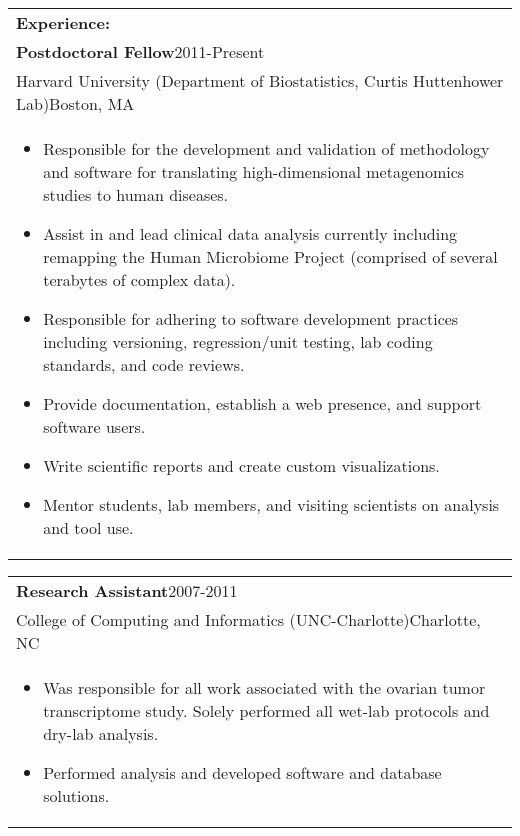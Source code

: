 \documentclass[12pt]{report}
\def\fullLength{6.5in}
\begin{document}
\begin{table}[!ht]
\begin{tabular}{p{\fullLength}}
\textbf{\Large Experience:}\\
\textbf{Postdoctoral Fellow}\hfill 2011-Present\\
Harvard University (Department of Biostatistics, Curtis Huttenhower Lab)\hfill Boston, MA\\
\vspace{-7.0mm}
\begin{itemize}\addtolength{\itemsep}{-0.5\baselineskip}
\item Responsible for the development and validation of methodology and software for translating high-dimensional metagenomics studies to human diseases.
\item Assist in and lead clinical data analysis currently including remapping the Human Microbiome Project (comprised of several terabytes of complex data).
\item Responsible for adhering to software development practices including versioning, regression/unit testing, lab coding standards, and code reviews.
\item Provide documentation, establish a web presence, and support software users.
\item Write scientific reports and create custom visualizations.
\item Mentor students, lab members, and visiting scientists on analysis and tool use.
\end{itemize}
\end{tabular}
\end{table}

\vspace{-12.0mm}

\begin{table}[!ht]
\begin{tabular}{p{\fullLength}}
\textbf{Research Assistant}\hfill 2007-2011\\
College of Computing and Informatics (UNC-Charlotte)\hfill Charlotte, NC\\
\vspace{-7.0mm}
\begin{itemize}\addtolength{\itemsep}{-0.5\baselineskip}
\item Was responsible for all work associated with the ovarian tumor transcriptome study. Solely performed all wet-lab protocols and dry-lab analysis.
\item Performed analysis and developed software and database solutions.
\end{itemize}
\end{tabular}
\end{table}
\end{document}
